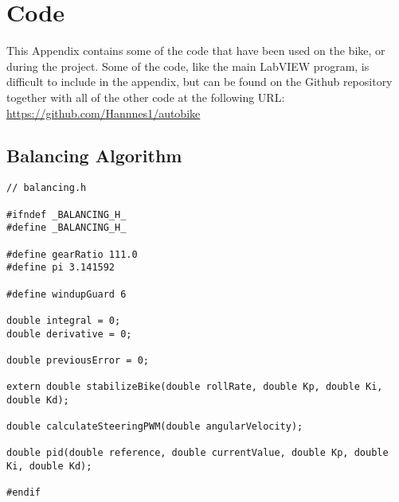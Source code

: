 \chapter{Code} \label{code}

This Appendix contains some of the code that have been used on the bike, or during the project. Some of the code, like the main LabVIEW program, is difficult to include in the appendix, but can be found on the Github repository together with all of the other code at the following URL: \url{https://github.com/Hannnes1/autobike}

\section{Balancing Algorithm} \label{code:balancing}


\begin{lstlisting}
// balancing.h

#ifndef _BALANCING_H_
#define _BALANCING_H_

#define gearRatio 111.0
#define pi 3.141592

#define windupGuard 6

double integral = 0;
double derivative = 0;

double previousError = 0;

extern double stabilizeBike(double rollRate, double Kp, double Ki, double Kd);

double calculateSteeringPWM(double angularVelocity);

double pid(double reference, double currentValue, double Kp, double Ki, double Kd);

#endif
\end{lstlisting}

\newpage

